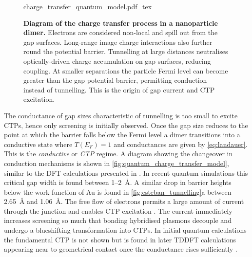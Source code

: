 \documentclass{article}
\begin{document}
\begin{figure}[bt]
\vspace{-5pt}
\def\svgwidth{0.9\textwidth}
\fontsize{10pt}{1em}\selectfont
{charge_transfer_quantum_model.pdf_tex}
\caption[Diagram of the charge transfer process in a nanoparticle dimer]{\textbf{Diagram of the charge transfer process in a nanoparticle dimer.} Electrons are considered non-local and spill out from the gap surfaces. Long-range image charge interactions also further round the potential barrier. Tunnelling at large distances neutralises optically-driven charge accumulation on gap surfaces, reducing coupling. At smaller separations the particle Fermi level can become greater than the gap potential barrier, permitting conduction instead of tunnelling. This is the origin of gap current and CTP excitation.}
\label{fig:quantum_charge_transfer_model}
\vspace{-15pt}
\end{figure}

The conductance of gap sizes characteristic of tunnelling is too small to excite CTPs, hence only screening is initially observed. Once the gap size reduces to the point at which the barrier falls below the Fermi level a dimer transitions into a conductive state where $T(E_F)=1$ and conductances are given by \eqref{eq:landauer}. This is the \emph{conductive} or \emph{CTP} regime. A diagram showing the changeover in conduction mechanisms is shown in \autoref{fig:quantum_charge_transfer_model}, similar to the DFT calculations presented in \cite{zuloaga2009}. In recent quantum simulations this critical gap width is found between 1--\SI{2}{\angstrom}. A similar drop in barrier heights below the work function of Au is found in \autoref{fig:esteban_tunnelling}a between \SI{2.65}{\angstrom} and \SI{1.06}{\angstrom}. The free flow of electrons permits a large amount of current through the junction and enables CTP excitation \cite{zuloaga2009}. The current immediately increases screening so much that bonding hybridised plasmons decouple and undergo a blueshifting transformation into CTPs. In initial quantum calculations \cite{zuloaga2009} the fundamental CTP is not shown but is found in later TDDFT calculations appearing near to geometrical contact once the conductance rises sufficiently \cite{esteban2012, scholl2013}.
\end{document}
